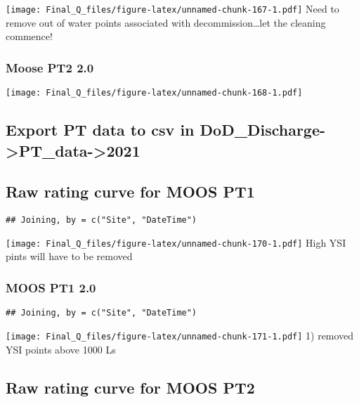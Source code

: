 \documentclass[
]{article}
\begin{document}
\texttt{[image: Final\_Q\_files/figure-latex/unnamed-chunk-167-1.pdf]}
Need to remove out of water points associated with
decommission\ldots let the cleaning commence!

\hypertarget{moose-pt2-2.0}{%
\subsubsection{Moose PT2 2.0}\label{moose-pt2-2.0}}

\texttt{[image: Final\_Q\_files/figure-latex/unnamed-chunk-168-1.pdf]}

\hypertarget{export-pt-data-to-csv-in-dod_discharge-pt_data-2021}{%
\subsection{Export PT data to csv in
DoD\_Discharge-\textgreater PT\_data-\textgreater2021}\label{export-pt-data-to-csv-in-dod_discharge-pt_data-2021}}

\hypertarget{raw-rating-curve-for-moos-pt1}{%
\subsection{Raw rating curve for MOOS
PT1}\label{raw-rating-curve-for-moos-pt1}}

\begin{verbatim}
## Joining, by = c("Site", "DateTime")
\end{verbatim}

\texttt{[image: Final\_Q\_files/figure-latex/unnamed-chunk-170-1.pdf]}
High YSI pints will have to be removed

\hypertarget{moos-pt1-2.0}{%
\subsubsection{MOOS PT1 2.0}\label{moos-pt1-2.0}}

\begin{verbatim}
## Joining, by = c("Site", "DateTime")
\end{verbatim}

\texttt{[image: Final\_Q\_files/figure-latex/unnamed-chunk-171-1.pdf]} 1)
removed YSI points above 1000 Ls

\hypertarget{raw-rating-curve-for-moos-pt2}{%
\subsection{Raw rating curve for MOOS
PT2}\label{raw-rating-curve-for-moos-pt2}}
\end{document}
